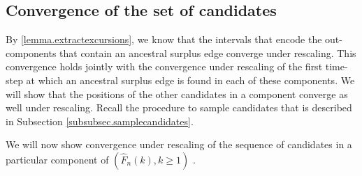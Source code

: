
\subsection{Convergence of the set of candidates}
By \cref{lemma.extractexcursions}, we know that the intervals that encode the out-components that contain an ancestral surplus edge converge under rescaling. This convergence holds jointly with the convergence under rescaling of the first time-step at which an ancestral surplus edge is found in each of these components. We will show that the positions of the other candidates in a component converge as well under rescaling. Recall the procedure to sample candidates that is described in Subsection \ref{subsubsec.samplecandidates}. 


We will now show convergence under rescaling of the sequence of candidates in a particular component of $(\hat{F}_n(k),k\geq 1)$ . 

